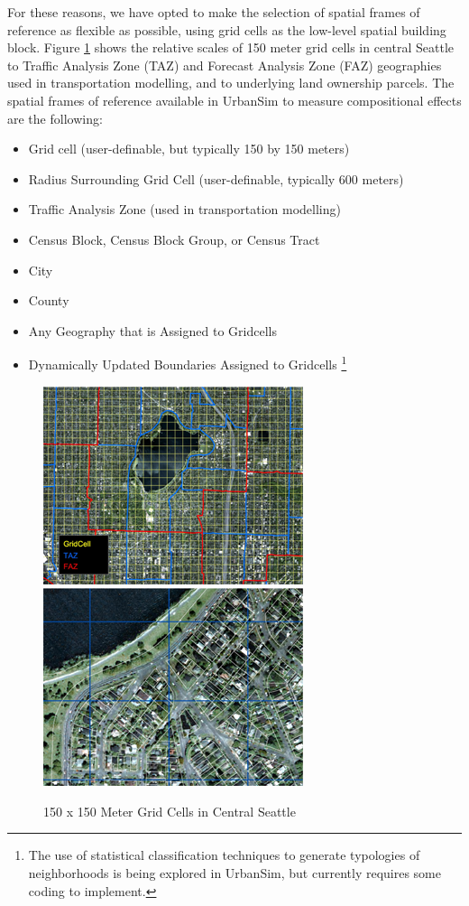 \documentclass[12pt,a4paper]{article}
\newcommand{\tight}{\itemsep 0pt}
\begin{document}
For these reasons, we have opted to make the selection of spatial
frames of reference as flexible as possible, using grid cells as
the low-level spatial building block. Figure \ref{fig:gridmap}
shows the relative scales of 150 meter grid cells in central
Seattle to Traffic Analysis Zone (TAZ) and Forecast Analysis Zone
(FAZ) geographies used in transportation modelling, and to
underlying land ownership parcels.  The spatial frames of
reference available in UrbanSim to measure compositional effects
are the following:

\begin{itemize}

\item Grid cell (user-definable, but typically 150 by 150 meters)
\tight

\item Radius Surrounding Grid Cell (user-definable, typically 600
meters)

\item Traffic Analysis Zone (used in transportation modelling)

\item Census Block, Census Block Group, or Census Tract

\item City

\item County

\item Any Geography that is Assigned to Gridcells

\item Dynamically Updated Boundaries Assigned to Gridcells
\footnote{The use of statistical classification techniques to
generate typologies of neighborhoods is being explored in
UrbanSim, but currently requires some coding to implement.}

\end{itemize}


\begin{figure}[h]
\centerline{
 \includegraphics[width=.45\textwidth,height=0.35\textwidth]
 {gridmap2-small.png} \hspace{1cm}
 \includegraphics[width=.45\textwidth,height=0.35\textwidth]
 {gridmap-small.png}}
\caption{\label{fig:gridmap} 150 x 150 Meter Grid Cells in Central
Seattle}
\end{figure}
\end{document}
